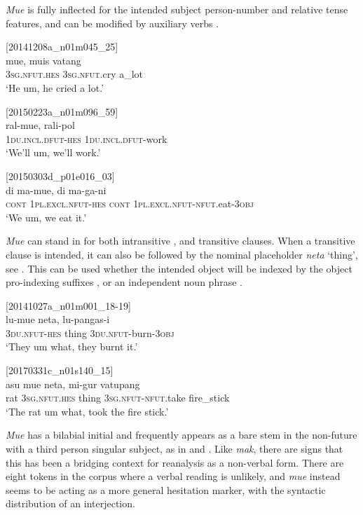 \documentclass[output=paper,colorlinks,citecolor=brown]{langscibook}
\begin{document}
\textit{Mue} is fully inflected for the intended subject person-number and relative tense features, and can be modified by auxiliary verbs .

\ea
{\label{ex:ridge:62}[20141208a\_n01m045\_25]}\\
\gll mue,    muis      vatang\\
     \textsc{3sg.nfut.hes}  \textsc{3sg.nfut.}cry   a\_lot\\
\glt ‘He um, he cried a lot.’
\z

\ea
{\label{ex:ridge:63}[20150223a\_n01m096\_59]}\\
\gll ral-mue,      rali-pol\\
     \textsc{1du.incl.dfut-hes}  \textsc{1du.incl.dfut}{}-work\\
\glt ‘We’ll um, we’ll work.’
\z

\ea
{\label{ex:ridge:64}[20150303d\_p01e016\_03]}\\
\gll di    ma-mue,    di        ma-ga-ni\\
     \textsc{cont}   \textsc{1pl.excl.nfut-hes} \textsc{cont}       \textsc{1pl.excl.nfut-nfut.}eat-\textsc{3obj}\\
\glt ‘We um, we eat it.’
\z

\textit{Mue} can stand in for both intransitive ,  and transitive  clauses. When a transitive clause is intended, it can also be followed by the nominal placeholder \textit{neta} ‘thing’, see . This can be used whether the intended object will be indexed by the object pro-indexing suffixes , or an independent noun phrase .

\ea
{\label{ex:ridge:65}[20141027a\_n01m001\_18-19]}\\
\gll lu-mue    neta,  lu-pangas-i\\
     \textsc{3du.nfut-hes}  thing  \textsc{3du.nfut-}burn-\textsc{3obj}\\
\glt ‘They um what, they burnt it.’
\z

\ea
{\label{ex:ridge:66}[20170331c\_n01s140\_15]}\\
\gll asu  mue      neta,  mi-gur    vatupang\\
     rat   \textsc{3sg.nfut.hes}   thing \textsc{3sg.nfut-nfut.}take fire\_stick\\
\glt ‘The rat um what, took the fire stick.’
\z

\textit{Mue} has a bilabial initial and frequently appears as a bare stem in the non-future with a third person singular subject, as in  and . Like \textit{mak}, there are signs that this has been a bridging context for reanalysis as a non-verbal form. There are eight tokens in the corpus where a verbal reading is unlikely, and \textit{mue} instead seems to be acting as a more general hesitation marker, with the syntactic distribution of an interjection.
\end{document}
